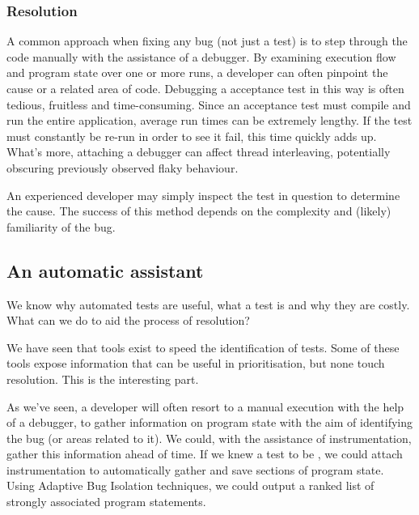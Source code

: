 \subsubsection{Resolution}

A common approach when fixing any bug (not just a \flaky test) is to step
through the code manually with the assistance of a debugger. By examining
execution flow and program state over one or more runs, a developer can often
pinpoint the cause or a related area of code. Debugging a \flaky acceptance test
in this way is often tedious, fruitless and time-consuming. Since an acceptance
test must compile and run the entire application, average run times can be
extremely lengthy. If the test must constantly be re-run in order to see it
fail, this time quickly adds up. What's more, attaching a debugger can affect
thread interleaving, potentially obscuring previously observed flaky behaviour.

An experienced developer may simply inspect the test in question to determine
the cause. The success of this method depends on the complexity and (likely)
familiarity of the bug.


\subsection{An automatic assistant}

We know why automated tests are useful, what a \flaky test is and why they are
costly. What can we do to aid the process of resolution?

We have seen that tools exist to speed the identification of \flaky tests. Some
of these tools expose information that can be useful in prioritisation, but none
touch resolution. This is the interesting part.

As we've seen, a developer will often resort to a manual execution with the help
of a debugger, to gather information on program state with the aim of
identifying the bug (or areas related to it). We could, with the assistance of
instrumentation, gather this information ahead of time. If we knew a test to be
\flaky, we could attach instrumentation to automatically gather and save
sections of program state. Using Adaptive Bug Isolation techniques, we could
output a ranked list of strongly associated program statements.

